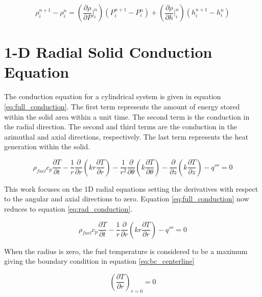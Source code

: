     \begin{equation}
    	\label{eq:EOS}
    	\rho_{i}^{n+1} - \rho_{i}^{n} = 
    	\left( \frac{ \partial \rho }{\partial P} \bigg|_{i}^{n}  \right) 
    	\left( P_{i}^{n+1} - P_{i}^{n} \right)
    	+ 
    	\left( \frac{ \partial \rho }{\partial h} \bigg|_{i}^{n} \right)
    	\left( h_{i}^{n+1} - h_{i}^{n} \right)
    \end{equation}

\section{1-D Radial Solid Conduction Equation} \label{sec:rad_conduction}

The conduction equation for a cylindrical system is given in equation \ref{eq:full_conduction}.
The first  term represents the amount of energy stored within the solid area within
a unit  time. The second term is the conduction in the radial direction. The
second  and third terms are the conduction in the azimuthal and axial
directions,  respectively. The last term represents the heat generation within
the solid.

\begin{equation}
	\label{eq:full_conduction}
	  \rho_{fuel}c_{p}\frac{\partial T}{\partial t}
	- \frac{1}{r}\frac{\partial}{\partial r}\left( 
		kr\frac{\partial T}{\partial r}\right)
	- \frac{1}{r^{2}}\frac{\partial}{\partial \theta}\left(
		k\frac{\partial T}{\partial \theta}\right)
	- \frac{\partial}{\partial z}\left(k\frac{\partial T}{\partial z}\right) 
	- q'''
	= 0
\end{equation}

This work focuses on the 1D radial equations setting the derivatives with
respect to the angular and axial directions to zero. Equation \ref{eq:full_conduction} now reduces
to equation \ref{eq:rad_conduction}.

\begin{equation}
	\label{eq:rad_conduction}
	  \rho_{fuel}c_{p}\frac{\partial T}{\partial t}
	- \frac{1}{r}\frac{\partial}{\partial r}\left( 
		kr\frac{\partial T}{\partial r}\right)
	- q'''
	= 0
\end{equation}

When the radius is zero, the fuel temperature is considered to be a maximum
giving the boundary condition in equation \ref{eq:bc_centerline}

\begin{equation}
	\label{eq:bc_centerline}
	\left(\frac{\partial T}{\partial r}\right)_{r=0}=0
\end{equation}


